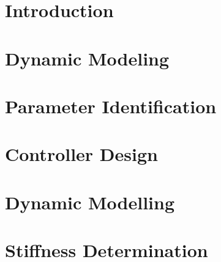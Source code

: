 \documentclass[12pt,twoside]{report}
\begin{document}

\thispagestyle{empty}



%

\tableofcontents

\cleardoublepage

\cleardoublepage







\chapter{Introduction}

\cleardoublepage

\chapter{Dynamic Modeling}

\cleardoublepage

\chapter{Parameter Identification}

\cleardoublepage


\chapter{Controller Design}

\cleardoublepage


%

%

%




\newpage


\cleardoublepage


\appendix
\chapter{Dynamic Modelling}



\appendix
\chapter{Stiffness Determination}

\end{document}
